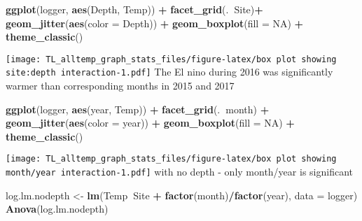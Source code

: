 \documentclass[
]{article}
\newenvironment{Shaded}{\begin{snugshade}}{\end{snugshade}}
\newcommand{\DataTypeTok}[1]{\textcolor[rgb]{0.13,0.29,0.53}{#1}}
\newcommand{\KeywordTok}[1]{\textcolor[rgb]{0.13,0.29,0.53}{\textbf{#1}}}
\newcommand{\NormalTok}[1]{#1}
\newcommand{\OperatorTok}[1]{\textcolor[rgb]{0.81,0.36,0.00}{\textbf{#1}}}
\newcommand{\OtherTok}[1]{\textcolor[rgb]{0.56,0.35,0.01}{#1}}
\newcommand{\StringTok}[1]{\textcolor[rgb]{0.31,0.60,0.02}{#1}}
\begin{document}
\begin{Shaded}
\begin{Highlighting}[]
\KeywordTok{ggplot}\NormalTok{(logger, }\KeywordTok{aes}\NormalTok{(Depth, Temp)) }\OperatorTok{+}\StringTok{ }\KeywordTok{facet_grid}\NormalTok{(.}\OperatorTok{~}\NormalTok{Site)}\OperatorTok{+}
\StringTok{   }\KeywordTok{geom_jitter}\NormalTok{(}\KeywordTok{aes}\NormalTok{(}\DataTypeTok{color =}\NormalTok{ Depth)) }\OperatorTok{+}
\StringTok{   }\KeywordTok{geom_boxplot}\NormalTok{(}\DataTypeTok{fill =} \OtherTok{NA}\NormalTok{) }\OperatorTok{+}\StringTok{ }
\StringTok{   }\KeywordTok{theme_classic}\NormalTok{()}
\end{Highlighting}
\end{Shaded}

\texttt{[image: TL\_alltemp\_graph\_stats\_files/figure-latex/box plot showing site:depth interaction-1.pdf]}
The El nino during 2016 was significantly warmer than corresponding
months in 2015 and 2017

\begin{Shaded}
\begin{Highlighting}[]
\KeywordTok{ggplot}\NormalTok{(logger, }\KeywordTok{aes}\NormalTok{(year, Temp)) }\OperatorTok{+}\StringTok{ }\KeywordTok{facet_grid}\NormalTok{(.}\OperatorTok{~}\NormalTok{month) }\OperatorTok{+}
\StringTok{   }\KeywordTok{geom_jitter}\NormalTok{(}\KeywordTok{aes}\NormalTok{(}\DataTypeTok{color =}\NormalTok{ year)) }\OperatorTok{+}
\StringTok{   }\KeywordTok{geom_boxplot}\NormalTok{(}\DataTypeTok{fill =} \OtherTok{NA}\NormalTok{) }\OperatorTok{+}\StringTok{ }
\StringTok{   }\KeywordTok{theme_classic}\NormalTok{()}
\end{Highlighting}
\end{Shaded}

\texttt{[image: TL\_alltemp\_graph\_stats\_files/figure-latex/box plot showing month/year interaction-1.pdf]}
with no depth - only month/year is significant

\begin{Shaded}
\begin{Highlighting}[]
\NormalTok{log.lm.nodepth <-}\StringTok{ }\KeywordTok{lm}\NormalTok{(Temp}\OperatorTok{~}\NormalTok{Site }\OperatorTok{+}\StringTok{ }\KeywordTok{factor}\NormalTok{(month)}\OperatorTok{/}\KeywordTok{factor}\NormalTok{(year), }\DataTypeTok{data =}\NormalTok{ logger)}
\KeywordTok{Anova}\NormalTok{(log.lm.nodepth)}
\end{Highlighting}
\end{Shaded}
\end{document}
